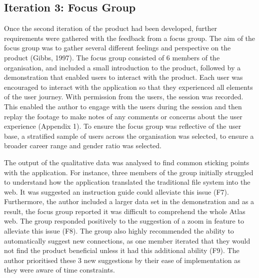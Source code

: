 \documentclass{article}
\begin{document}
\subsection{Iteration 3: Focus Group}

Once the second iteration of the product had been developed, further requirements were gathered with the feedback from a focus group. The aim of the focus group was to gather several different feelings and perspective on the product (Gibbs, 1997). The focus group consisted of 6 members of the organisation, and included a small introduction to the product, followed by a demonstration that enabled users to interact with the product. Each user was encouraged to interact with the application so that they experienced all elements of the user journey. With permission from the users, the session was recorded. This enabled the author to engage with the users during the session and then replay the footage to make notes of any comments or concerns about the user experience (Appendix 1). To ensure the focus group was reflective of the user base, a stratified sample of users across the organisation was selected, to ensure a broader career range and gender ratio was selected. 

The output of the qualitative data was analysed to find common sticking points with the application. For instance, three members of the group initially struggled to understand how the application translated the traditional file system into the web. It was suggested an instruction guide could alleviate this issue (F7). Furthermore, the author included a larger data set in the demonstration and as a result, the focus group reported it was difficult to comprehend the whole Atlas web. The group responded positively to the suggestion of a zoom in feature to alleviate this issue (F8). The group also highly recommended the ability to automatically suggest new connections, as one member iterated that they would not find the product beneficial unless it had this additional ability (F9). The author prioritised these 3 new suggestions by their ease of implementation as they were aware of time constraints.
\end{document}
